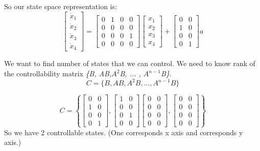 \documentclass[10pt,letterpaper]{article}
\begin{document}
So our state space representation is:
\begin{equation}
\begin{bmatrix}
\dot{x}_1\\ 
\dot{x}_2\\
\dot{x}_3\\
\dot{x}_4
\end{bmatrix} = \begin{bmatrix}
0 & 1 & 0 & 0 \\
0 & 0 & 0 & 0\\
0 & 0 & 0 & 1\\
0 & 0 & 0 & 0
\end{bmatrix}  \begin{bmatrix}
x_1\\
x_2\\
x_3\\
x_4
\end{bmatrix} + \begin{bmatrix}
0 & 0 \\
1 & 0 \\
0 & 0 \\
0 & 1
\end{bmatrix} a
\end{equation}

We want to find number of states that we can control. We need to know rank of the controllability matrix \emph{\{B, AB,$A^2$B, ... , $A^{n-1}$B\}}.
\begin{equation}
C = \{ B, AB, A^2B, ... , A^{n-1}B \}
\end{equation}

\begin{equation}
C=\left\{
\begin{bmatrix} 
0 & 0\\
1 & 0 \\
0 & 0 \\
0 & 1
\end{bmatrix}
,
\begin{bmatrix} 
1 & 0\\
0 & 0\\
0 & 1\\
0 & 0
\end{bmatrix}
\begin{bmatrix} 
0 & 0\\
0 & 0\\
0 & 0\\
0 & 0
\end{bmatrix}
,
\begin{bmatrix} 
0 & 0\\
0 & 0\\
0 & 0\\
0 & 0
\end{bmatrix}
 \right\}
\end{equation}
So we have 2 controllable states. (One corresponds x axis and corresponds y axis.)
\end{document}
